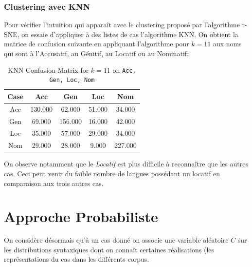 \documentclass{cours}
\begin{document}
\subsubsection{Clustering avec KNN}\label{subsub:knn}
Pour vérifier l'intuition qui apparaît avec le clustering proposé par l'algorithme t-SNE, on essaie d'appliquer à des listes de cas l'algorithme KNN.
On obtient la matrice de confusion suivante en appliquant l'algorithme pour $k = 11$ aux noms qui sont à l'Accusatif, au Génitif, au Locatif ou au Nominatif:
\begin{table}[H]
	\centering
	\begin{tabular}{ccccc}
		Case & Acc & Gen & Loc & Nom\\
		\midrule
		Acc & 130.000 & 62.000 & 51.000 & 34.000\\
		Gen & 69.000 & 156.000 & 16.000 & 42.000\\
		Loc & 35.000 & 57.000 & 29.000 & 34.000\\
		Nom & 29.000 & 28.000 & 9.000 & 227.000\\
	\end{tabular}
	\caption{KNN Confusion Matrix for $k = 11$ on \texttt{Acc, Gen, Loc, Nom}}
\end{table}

On observe notamment que le \emph{Locatif} est plus difficile à reconnaître que les autres cas. Ceci peut venir du faible nombre de langues possédant un locatif en comparaison aux trois autres cas.

\newpage
\section{Approche Probabiliste}\label{sec:probas}
On considère désormais qu'à un cas donné on associe une variable aléatoire $C$ sur les distributions syntaxiques dont on connaît certaines réalisations (les représentations du cas dans les différents corpus.
\end{document}
